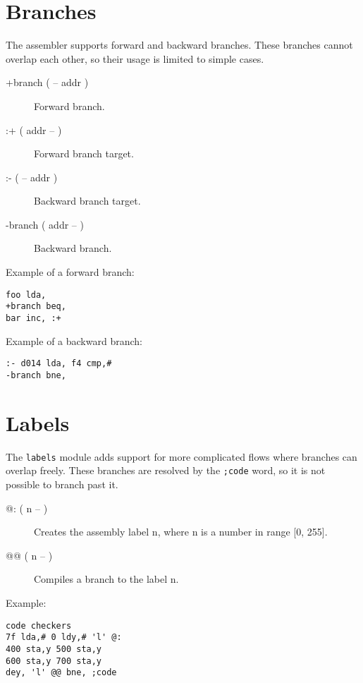 \section{Branches}

The assembler supports forward and backward branches. These branches cannot overlap each other, so their usage is limited to simple cases.

\begin{description}
    \item[+branch ( -- addr )] Forward branch.
    \item[:+ ( addr -- )] Forward branch target.
    \item[:- ( -- addr )] Backward branch target.
    \item[-branch ( addr -- )] Backward branch.
\end{description}

Example of a forward branch:

\begin{verbatim}
foo lda,
+branch beq,
bar inc, :+
\end{verbatim}

Example of a backward branch:

\begin{verbatim}
:- d014 lda, f4 cmp,#
-branch bne,
\end{verbatim}

\section{Labels}

The \texttt{labels} module adds support for more complicated flows where branches can overlap freely. These branches are resolved by the \texttt{;code} word, so it is not possible to branch past it.

\begin{description}
    \item[@: ( n -- )] Creates the assembly label n, where n is a number in range [0, 255].
    \item[@@ ( n -- )] Compiles a branch to the label n.
\end{description}

Example:

\begin{verbatim}
code checkers
7f lda,# 0 ldy,# 'l' @:
400 sta,y 500 sta,y
600 sta,y 700 sta,y
dey, 'l' @@ bne, ;code
\end{verbatim}
